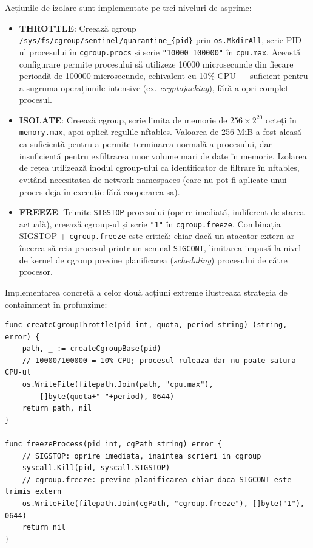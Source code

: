 \par Acțiunile de izolare sunt implementate pe trei niveluri de asprime:

\begin{itemize}
    \item \textbf{THROTTLE}: Creează cgroup \texttt{/sys/fs/cgroup/sentinel/quarantine\_\{pid\}} prin \texttt{os.MkdirAll}, scrie PID-ul procesului în \texttt{cgroup.procs} și scrie \texttt{"10000 100000"} în \texttt{cpu.max}. Această configurare permite procesului să utilizeze 10000 microsecunde din fiecare perioadă de 100000 microsecunde, echivalent cu 10\% CPU --- suficient pentru a sugruma operațiunile intensive (ex. \textit{cryptojacking}), fără a opri complet procesul.
    \item \textbf{ISOLATE}: Creează cgroup, scrie limita de memorie de $256 \times 2^{20}$ octeți în \texttt{memory.max}, apoi aplică regulile nftables. Valoarea de 256 MiB a fost aleasă ca suficientă pentru a permite terminarea normală a procesului, dar insuficientă pentru exfiltrarea unor volume mari de date în memorie. Izolarea de rețea utilizează inodul cgroup-ului ca identificator de filtrare în nftables, evitând necesitatea de network namespaces (care nu pot fi aplicate unui proces deja în execuție fără cooperarea sa).
    \item \textbf{FREEZE}: Trimite \texttt{SIGSTOP} procesului (oprire imediată, indiferent de starea actuală), creează cgroup-ul și scrie \texttt{"1"} în \texttt{cgroup.freeze}. Combinația SIGSTOP + \texttt{cgroup.freeze} este critică: chiar dacă un atacator extern ar încerca să reia procesul printr-un semnal \texttt{SIGCONT}, limitarea impusă la nivel de kernel de cgroup previne planificarea (\textit{scheduling}) procesului de către procesor.
\end{itemize}

\par Implementarea concretă a celor două acțiuni extreme ilustrează strategia de containment în profunzime:

\begin{lstlisting}[style=gostyle,caption={Implementarea acțiunilor THROTTLE și FREEZE}]
func createCgroupThrottle(pid int, quota, period string) (string, error) {
    path, _ := createCgroupBase(pid)
    // 10000/100000 = 10% CPU; procesul ruleaza dar nu poate satura CPU-ul
    os.WriteFile(filepath.Join(path, "cpu.max"),
        []byte(quota+" "+period), 0644)
    return path, nil
}

func freezeProcess(pid int, cgPath string) error {
    // SIGSTOP: oprire imediata, inaintea scrieri in cgroup
    syscall.Kill(pid, syscall.SIGSTOP)
    // cgroup.freeze: previne planificarea chiar daca SIGCONT este trimis extern
    os.WriteFile(filepath.Join(cgPath, "cgroup.freeze"), []byte("1"), 0644)
    return nil
}
\end{lstlisting}

